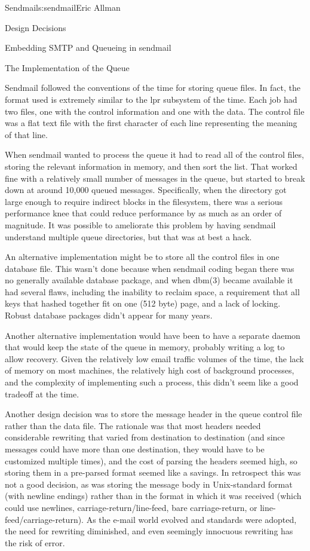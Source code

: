 \begin{aosachapter}{Sendmail}{s:sendmail}{Eric Allman}
\begin{aosasect1}{Design Decisions}
\begin{aosasect2}{Embedding SMTP and Queueing in sendmail}
\end{aosasect2}

\begin{aosasect2}{The Implementation of the Queue}

Sendmail followed the conventions of the time for storing queue files.
In fact, the format used is extremely similar to the lpr subsystem of
the time.  Each job had two files, one with the control information
and one with the data. The control file was a flat text file with the
first character of each line representing the meaning of that line.

When sendmail wanted to process the queue it had to read all of the
control files, storing the relevant information in memory, and then
sort the list. That worked fine with a relatively small number of
messages in the queue, but started to break down at around 10,000
queued messages. Specifically, when the directory got large enough to
require indirect blocks in the filesystem, there was a serious
performance knee that could reduce performance by as much as an order
of magnitude. It was possible to ameliorate this problem by having
sendmail understand multiple queue directories, but that was at best a
hack.

An alternative implementation might be to store all the control files
in one database file. This wasn't done because when sendmail coding
began there was no generally available database package, and when
dbm(3) became available it had several flaws, including the inability
to reclaim space, a requirement that all keys that hashed together fit
on one (512 byte) page, and a lack of locking. Robust database
packages didn't appear for many years.

Another alternative implementation would have been to have a separate
daemon that would keep the state of the queue in memory, probably
writing a log to allow recovery. Given the relatively low email
traffic volumes of the time, the lack of memory on most machines,
the relatively high cost of background processes,
and the complexity of implementing such a process,
this didn't seem
like a good tradeoff at the time.

Another design decision was to store the message header in the queue
control file rather than the data file. The rationale was that most
headers needed considerable rewriting that varied from destination to
destination (and since messages could have more than one destination,
they would have to be customized multiple times), and the cost of
parsing the headers seemed high, so storing them in a pre-parsed
format seemed like a savings. In retrospect this was not a good decision,
as was storing the message body in Unix-standard format (with newline
endings) rather than in the format in which it was received (which
could use newlines, carriage-return/line-feed, bare carriage-return,
or line-feed/carriage-return). As the e-mail world evolved and
standards were adopted, the need for rewriting diminished, and even
seemingly innocuous rewriting has the risk of error.


\end{aosasect2}
\end{aosasect1}
\end{aosachapter}
